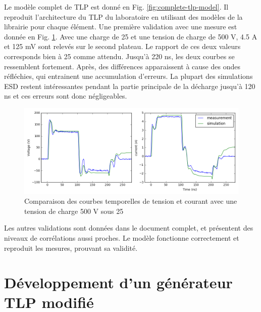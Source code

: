 Le modèle complet de TLP est donné en Fig. \ref{fig:complete-tlp-model}.
Il reproduit l'architecture du TLP du laboratoire en utilisant des modèles de la librairie pour chaque élément.
Une première validation avec une mesure est donnée en Fig. \ref{fig:comparison-tlp-load}.
Avec une charge de 25\textOmega{} et une tension de charge de 500 V, 4.5 A et 125 mV sont relevés sur le second plateau.
Le rapport de ces deux valeurs corresponds bien à 25\textOmega{} comme attendu.
Jusqu'à 220 ns, les deux courbes se ressemblent fortement.
Après, des différences apparaissent à cause des ondes réfléchies, qui entrainent une accumulation d'erreurs.
La plupart des simulations ESD restent intéressantes pendant la partie principale de la décharge jusqu'à 120 ns et ces erreurs sont donc négligeables.

\begin{figure}[!h]
  \centering
  \includegraphics[width=\textwidth]{src/1/figures/tlp_comparison_R25_500V.png}
  \caption{Comparaison des courbes temporelles de tension et courant avec une  tension de charge 500 V sous 25\textOmega{}}
  \label{fig:comparison-tlp-load}
\end{figure}

Les autres validations sont données dans le document complet, et présentent des niveaux de corrélations aussi proches.
Le modèle fonctionne correctement et reproduit les mesures, prouvant sa validité.

\section{Développement d'un générateur TLP modifié}

